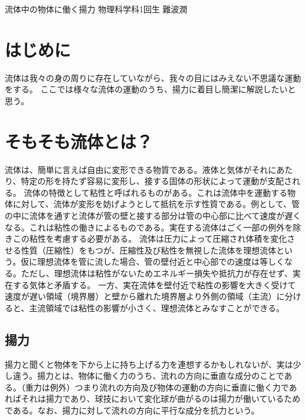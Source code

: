 \documentclass[10pt,b5paper,papersize,dvipdfmx]{jsbook}
\begin{document}

\kaishititle%
  {流体中の物体に働く揚力}%
  {物理科学科1回生}%
  {難波潤}%


%
\section*{はじめに}
流体は我々の身の周りに存在していながら、我々の目にはみえない不思議な運動をする。
ここでは様々な流体の運動のうち、揚力に着目し簡潔に解説したいと思う。
\par
\section{そもそも流体とは？}
流体は、簡単に言えば自由に変形できる物質である。液体と気体がそれにあたり、特定の形を持たず容易に変形し、接する固体の形状によって運動が支配される。
流体の特徴として粘性と呼ばれるものがある。これは流体中を運動する物体に対して、流体が変形を妨げようとして抵抗を示す性質である。例として、管の中に流体を通すと流体が管の壁と接する部分は管の中心部に比べて速度が遅くなる。これは粘性の働きによるものである。実在する流体はごく一部の例外を除きこの粘性を考慮する必要がある。
流体は圧力によって圧縮され体積を変化させる性質（圧縮性）をもつが、圧縮性及び粘性を無視した流体を理想流体という。仮に理想流体を管に流した場合、管の壁付近と中心部での速度は等しくなる。ただし、理想流体は粘性がないためエネルギー損失や抵抗力が存在せず、実在する気体と矛盾する。
一方、実在流体を壁付近で粘性の影響を大きく受けて速度が遅い領域（境界層）と壁から離れた境界層より外側の領域（主流）に分けると、主流領域では粘性の影響が小さく、理想流体とみなすことができる。
\par
\subsection{揚力}
揚力と聞くと物体を下から上に持ち上げる力を連想するかもしれないが、実は少し違う。揚力とは、物体に働く力のうち、流れの方向に垂直な成分のことである。（重力は例外）つまり流れの方向及び物体の運動の方向に垂直に働く力であればそれは揚力であり、球技において変化球が曲がるのは揚力が働いているためである。なお、揚力に対して流れの方向に平行な成分を抗力という。
\par
\end{document}
